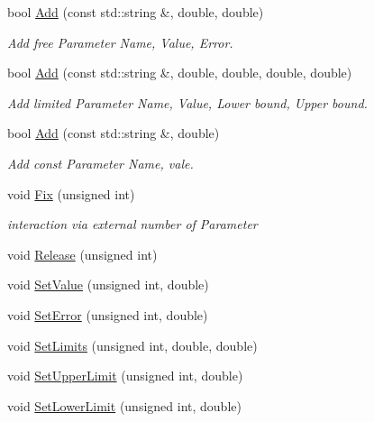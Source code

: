 \begin{DoxyCompactItemize}
bool \mbox{\hyperlink{classROOT_1_1Minuit2_1_1MnUserParameters_a95405d43b783605dba2ead1ba3125ebc}{Add}} (const std\+::string \&, double, double)
\begin{DoxyCompactList}\small\item\em Add free Parameter Name, Value, Error. \end{DoxyCompactList}\item 
bool \mbox{\hyperlink{classROOT_1_1Minuit2_1_1MnUserParameters_ab5e82031e879bf6937975b884784c126}{Add}} (const std\+::string \&, double, double, double, double)
\begin{DoxyCompactList}\small\item\em Add limited Parameter Name, Value, Lower bound, Upper bound. \end{DoxyCompactList}\item 
bool \mbox{\hyperlink{classROOT_1_1Minuit2_1_1MnUserParameters_acb750b2b34d2a7a233f559d6820bbb35}{Add}} (const std\+::string \&, double)
\begin{DoxyCompactList}\small\item\em Add const Parameter Name, vale. \end{DoxyCompactList}\item 
void \mbox{\hyperlink{classROOT_1_1Minuit2_1_1MnUserParameters_a53ce277313d9e1f8503e7ffbf8e7bce4}{Fix}} (unsigned int)
\begin{DoxyCompactList}\small\item\em interaction via external number of Parameter \end{DoxyCompactList}\item 
void \mbox{\hyperlink{classROOT_1_1Minuit2_1_1MnUserParameters_a7bd8fe4d8f50de145f3f3abc6ec4fae4}{Release}} (unsigned int)
\item 
void \mbox{\hyperlink{classROOT_1_1Minuit2_1_1MnUserParameters_a6a2523d00c1b000fbc1c95da7a4a926a}{Set\+Value}} (unsigned int, double)
\item 
void \mbox{\hyperlink{classROOT_1_1Minuit2_1_1MnUserParameters_a64cbb6833d91d7f3bdef5b4dec9ae20f}{Set\+Error}} (unsigned int, double)
\item 
void \mbox{\hyperlink{classROOT_1_1Minuit2_1_1MnUserParameters_afa56296f97716c90cfbdd3f81d5caffc}{Set\+Limits}} (unsigned int, double, double)
\item 
void \mbox{\hyperlink{classROOT_1_1Minuit2_1_1MnUserParameters_a9127811ac07731aea64f1869a620d11b}{Set\+Upper\+Limit}} (unsigned int, double)
\item 
void \mbox{\hyperlink{classROOT_1_1Minuit2_1_1MnUserParameters_a5fa6d9f50413c05aabed1d11ee26c6cc}{Set\+Lower\+Limit}} (unsigned int, double)

\end{DoxyCompactItemize}
